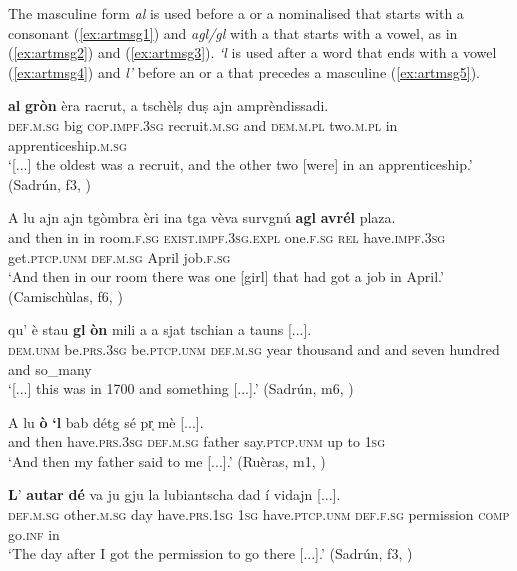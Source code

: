 The masculine form \textit{al} is used before a  or a nominalised  that starts with a consonant (\ref{ex:artmsg1}) and \textit{agl/gl} with a  that starts with a vowel, as in (\ref{ex:artmsg2}) and (\ref{ex:artmsg3}). \textit{`l} is used after a word that ends with a vowel (\ref{ex:artmsg4}) and \textit{l'} before an  or a  that precedes a masculine  (\ref{ex:artmsg5}).

\ea\label{ex:artmsg1}
\gll   [...] \textbf{al} \textbf{gròn} èra racrut, a tschèlṣ duṣ ajn amprèndissadi. \\
{} \textsc{def.m.sg} big \textsc{cop.impf.3sg} recruit.\textsc{m.sg} and \textsc{dem.m.pl} two.\textsc{m.pl} in apprenticeship.\textsc{m.sg}\\
\glt `[...] the oldest was a recruit, and the other two [were] in an apprenticeship.' (Sadrún, f3, )
\z

\ea\label{ex:artmsg2}
\gll A lu ajn ajn tgòmbra èri ina tga vèva survgnú \textbf{agl} \textbf{avrél} plaza.\\
and then in in room.\textsc{f.sg} \textsc{exist.impf.3sg.expl} one.\textsc{f.sg} \textsc{rel} have.\textsc{impf.3sg} get.\textsc{ptcp.unm} \textsc{def.m.sg} April job.\textsc{f.sg}\\
\glt `And then in our room there was one [girl] that had got a job in April.' (Camischùlas, f6, )
\z

\ea
\label{ex:artmsg3}
\gll [...] qu' è stau \textbf{gl} \textbf{òn} mili a a sjat tschian a tauns [...].\\
{} \textsc{dem.unm} be.\textsc{prs.3sg} be.\textsc{ptcp.unm} \textsc{def.m.sg} year thousand and and seven hundred and so\_many\\
\glt `[...] this was in 1700 and something [...].' (Sadrún, m6, )
\z

\ea\label{ex:artmsg4}
\gll A lu \textbf{ò} \textbf{`l} bab détg sé pr̩ mè [...].\\
and then have.\textsc{prs.3sg} \textsc{def.m.sg} father  say.\textsc{ptcp.unm} up to \textsc{1sg}\\
\glt `And then my father said to me [...].' (Ruèras, m1, )
\z

\ea\label{ex:artmsg5}
\gll  \textbf{L}’ \textbf{autar} \textbf{dé} va ju gju la lubiantscha dad í vidajn [...].  \\
 \textsc{def.m.sg} other.\textsc{m.sg} day have.\textsc{prs.1sg} \textsc{1sg} have.\textsc{ptcp.unm} \textsc{def.f.sg} permission \textsc{comp} go.\textsc{inf} in\\
\glt `The day after I got the permission to go there [...].' (Sadrún, f3, )
\z

